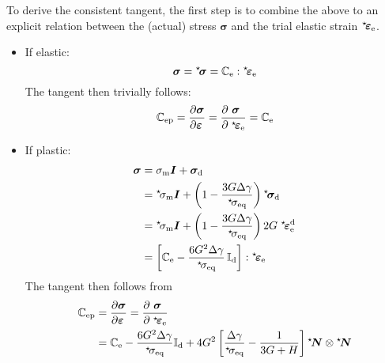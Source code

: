 \documentclass[times]{goose-article}
\newcommand\leftstar[1]{\hspace*{-.3em}~^\star\!#1}
\begin{document}
To derive the consistent tangent, the first step is to combine the above to an explicit relation between the (actual) stress $\bm{\sigma}$ and the trial elastic strain $\leftstar{\bm{\varepsilon}}_\mathrm{e}$.
\begin{itemize}
\item If elastic:
\begin{equation}
  \bm{\sigma}
    = \leftstar{\bm{\sigma}}
    = \mathbb{C}_\mathrm{e} : \leftstar{\bm{\varepsilon}}_\mathrm{e}
\end{equation}
The tangent then trivially follows:
\begin{equation}
  \mathbb{C}_\mathrm{ep}
  =
  \frac{
    \partial  \bm{\sigma} \hfill
  }{
    \partial \bm{\varepsilon} \hfill
  }
  =
  \frac{
    \partial ~\bm{\sigma} \hfill
  }{
    \partial \;\leftstar{\bm{\varepsilon}}_\mathrm{e} \hfill
  }
  =
  \mathbb{C}_\mathrm{e}
\end{equation}
\item If plastic:
\begin{align}
  \bm{\sigma}
    &= \sigma_\mathrm{m} \bm{I}
     + \bm{\sigma}_\mathrm{d}
    \\
    &= \leftstar{\sigma}_\mathrm{m} \bm{I}
    + \left( 1- \frac{3 G \Delta \gamma}{\leftstar{\sigma}_\mathrm{eq}} \right)
      \leftstar{\bm{\sigma}}_\mathrm{d}
    \\
    &= \leftstar{\sigma}_\mathrm{m} \bm{I}
     + \left( 1-\frac{3 G \Delta\gamma}{\leftstar{\sigma}_\mathrm{eq}} \right)
       2 G \; \leftstar{\bm{\varepsilon}}_\mathrm{e}^\mathrm{d}
    \\
    &=
    \left[
      \mathbb{C}_\mathrm{e} -
      \frac{6 G^2 \Delta \gamma}{\leftstar{\sigma}_\mathrm{eq}} \, \mathbb{I}_\mathrm{d}
    \right] : \leftstar{\bm{\varepsilon}}_\mathrm{e}
\end{align}
The tangent then follows from
\begin{align}
  \mathbb{C}_\mathrm{ep} &=
  \frac{
    \partial  \bm{\sigma} \hfill
  }{
    \partial \bm{\varepsilon} \hfill
  } =
  \frac{
    \partial ~\bm{\sigma} \hfill
  }{
    \partial \;\leftstar{\bm{\varepsilon}}_\mathrm{e} \hfill
  }
  \\
  &=
  \mathbb{C}_\mathrm{e} -
  \frac{6 G^2 \Delta \gamma}{\leftstar{\sigma}_\mathrm{eq}}
  \mathbb{I}_\mathrm{d}
  + 4 G^2
  \left[
    \frac{\Delta \gamma}{\leftstar{\sigma}_\mathrm{eq}} -
    \frac{1}{3 G + H}
  \right]
  \leftstar{\bm{N}} \otimes \leftstar{\bm{N}}
\end{align}
\end{itemize}
\end{document}
